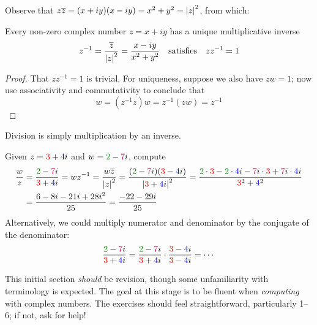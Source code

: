 Observe that $z\overline{z}=(x+iy)(x-iy)=x^2+y^2=\left| z\right|^2$, from which:

\begin{lemm}{}{}
	Every non-zero complex number $z=x+iy$ has a unique multiplicative inverse
	\[
		z^{-1}=\frac{\overline{z}}{\left| z\right|^2}=\frac{x-iy}{x^2+y^2} \quad\text{satisfies}\quad zz^{-1}=1
	\]
\end{lemm}

\begin{proof}
	That $zz^{-1}=1$ is trivial. For uniqueness, suppose we also have $zw=1$; now use associativity and commutativity to conclude that
	\[
		w=(z^{-1}z)w=z^{-1}(zw)=z^{-1}\tag*{\qedhere}
	\]
\end{proof}

Division is simply multiplication by an inverse.

\begin{example}{}{}
	Given $z=\textcolor{red}{3}+\textcolor{blue}{4}i$ and $w=\textcolor{Green}{2}-\textcolor{purple}{7}i$, compute
	\begin{align*}
		\frac wz
		&= \frac{\textcolor{Green}{2} - \textcolor{purple}{7}i}{\textcolor{red}{3} + \textcolor{blue}{4}i}
		= wz^{-1}
		= \frac{w\cl z}{\nm z^2} 
		= \frac{(\textcolor{Green}{2} - \textcolor{purple}{7}i)(\textcolor{red}{3} - \textcolor{blue}{4}i)}{\nm{\textcolor{red}{3} + \textcolor{blue}{4}i}^2}
		= \frac{\textcolor{Green}{2} \cdot \textcolor{red}{3} - \textcolor{Green}{2} \cdot \textcolor{blue}{4}i - \textcolor{purple}{7}i \cdot \textcolor{red}{3} + \textcolor{purple}{7}i \cdot \textcolor{blue}{4}i}{\textcolor{red}{3}^2 + \textcolor{blue}{4}^2}\\
		&= \frac{6-8i-21i+28i^2}{25}
		= \frac{-22-29i}{25}
	\end{align*}
	Alternatively, we could multiply numerator and denominator by the conjugate\footnotemark{} of the denominator:
	\[
		\frac{\textcolor{Green}{2} - \textcolor{purple}{7}i}{\textcolor{red}{3} + \textcolor{blue}{4}i}
		= \frac{\textcolor{Green}{2} - \textcolor{purple}{7}i}{\textcolor{red}{3} + \textcolor{blue}{4}i} \cdot \frac{\textcolor{red}{3} - \textcolor{blue}{4}i}{\textcolor{red}{3} - \textcolor{blue}{4}i}
		= \cdots
	\]
\end{example}



This initial section \emph{should} be revision, though some unfamiliarity with terminology is expected. The goal at this stage is to be fluent when \emph{computing} with complex numbers. The exercises should feel straightforward, particularly 1--6; if not, ask for help! 

